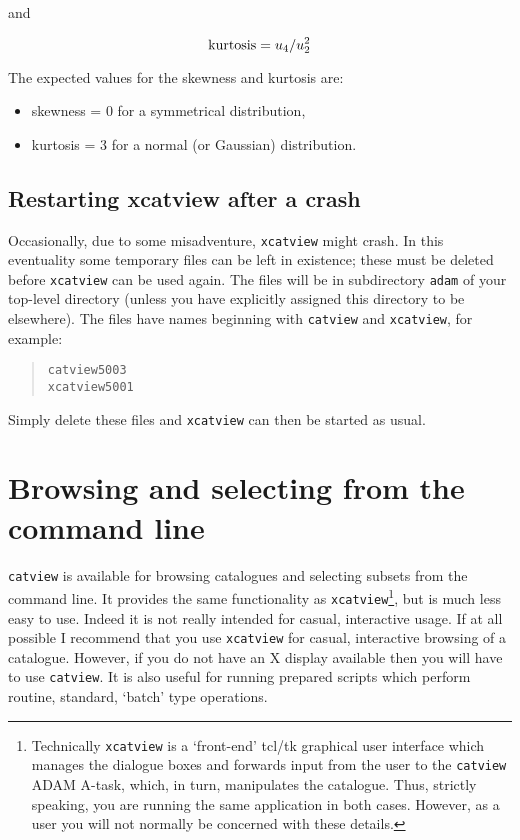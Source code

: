 \documentclass[twoside,11pt]{article}
\newcommand{\xlabel}[1]{}
\renewcommand{\_}{\texttt{\symbol{95}}}
\begin{document}
\begin{itemize}
   and

  \begin{equation}
   {\rm kurtosis} = u_{4} / u_{2}^{2}
  \end{equation}

   The expected values for the skewness and kurtosis are:

  \begin{itemize}

    \item skewness = 0 for a symmetrical distribution,

    \item kurtosis = 3 for a normal (or Gaussian) distribution.

  \end{itemize}

\end{itemize}

\subsection{Restarting xcatview after a crash}

Occasionally, due to some misadventure, {\tt xcatview} might crash.  In
this eventuality some temporary files can be left in existence; these must
be deleted before {\tt xcatview} can be used again.  The files will be in
subdirectory {\tt adam} of your top-level directory (unless you have
explicitly assigned this directory to be elsewhere).  The files have names
beginning with {\tt catview} and {\tt xcatview}, for example:

\begin{verse}
{\tt catview\_5003  \\
xcatview\_5001}
\end{verse}

Simply delete these files and {\tt xcatview} can then be started as usual.


\section{\xlabel{VIEW}\label{VIEW}Browsing and selecting from the command line}

{\tt catview} is available for browsing catalogues and selecting subsets
from the command line. It provides the same functionality as
{\tt xcatview}\footnote{Technically {\tt xcatview} is a `front-end'
tcl/tk graphical user interface which manages the dialogue boxes and
forwards input from the user to the {\tt catview} ADAM A-task, which,
in turn, manipulates the catalogue. Thus, strictly speaking, you are
running the same application in both cases. However, as a user you will
not normally be concerned with these details.}, but is much less easy to
use. Indeed it is not really intended for casual, interactive usage. If at
all possible I recommend that you use {\tt xcatview} for casual, interactive
browsing of a catalogue. However, if you do not have an X display available
then you will have to use {\tt catview}. It is also useful for running
prepared scripts which perform routine, standard, `batch' type operations.
\end{document}
